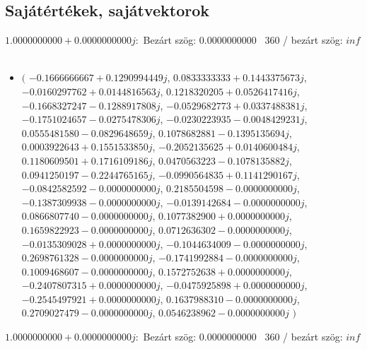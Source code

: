 \documentclass[14pt,a4paper]{article}
\begin{document}
\subsection{Sajátértékek, sajátvektorok}
$1.0000000000+0.0000000000j$:\
Bezárt szög: $0.0000000000$ \
360 / bezárt szög: $inf$\
\begin{itemize}
\item
$\big($
$-0.1666666667+0.1290994449j$, $0.0833333333+0.1443375673j$, $-0.0160297762+0.0144816563j$, $0.1218320205+0.0526417416j$, $-0.1668327247-0.1288917808j$, $-0.0529682773+0.0337488381j$, $-0.1751024657-0.0275478306j$, $-0.0230223935-0.0048429231j$, $0.0555481580-0.0829648659j$, $0.1078682881-0.1395135694j$, $0.0003922643+0.1551533850j$, $-0.2052135625+0.0140600484j$, $0.1180609501+0.1716109186j$, $0.0470563223-0.1078135882j$, $0.0941250197-0.2244765165j$, $-0.0990564835+0.1141290167j$, $-0.0842582592-0.0000000000j$, $0.2185504598-0.0000000000j$, $-0.1387309938-0.0000000000j$, $-0.0139142684-0.0000000000j$, $0.0866807740-0.0000000000j$, $0.1077382900+0.0000000000j$, $0.1659822923-0.0000000000j$, $0.0712636302-0.0000000000j$, $-0.0135309028+0.0000000000j$, $-0.1044634009-0.0000000000j$, $0.2698761328-0.0000000000j$, $-0.1741992884-0.0000000000j$, $0.1009468607-0.0000000000j$, $0.1572752638+0.0000000000j$, $-0.2407807315+0.0000000000j$, $-0.0475925898+0.0000000000j$, $-0.2545497921+0.0000000000j$, $0.1637988310-0.0000000000j$, $0.2709027479-0.0000000000j$, $0.0546238962-0.0000000000j$
$\big)$
\end{itemize}
$1.0000000000+0.0000000000j$:\
Bezárt szög: $0.0000000000$ \
360 / bezárt szög: $inf$\
\end{document}
